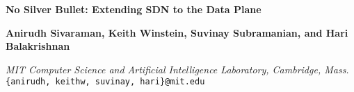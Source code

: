 \documentclass[csaild4,portrait]{xa0poster}
\title{}
\author{}
\affiliation{}
\begin{document}
\def\secheadcol{blue}
\def\rightlogoscale{0.7}
\maketitle
\vspace{-7.9in} %
\begin{centering}
{\LARGE \bf{No Silver Bullet: Extending SDN to the Data Plane}
}

\vspace{\baselineskip}

{\LARGE \bf {Anirudh Sivaraman, Keith Winstein, Suvinay Subramanian, and Hari Balakrishnan}}

{\LARGE \textit {MIT Computer Science and Artificial Intelligence Laboratory, Cambridge, Mass.}}\\
{\LARGE \texttt {\{anirudh, keithw, suvinay, hari\}@mit.edu}}

\end{centering}

\vspace{\baselineskip}




\end{document}
